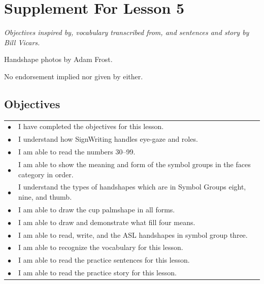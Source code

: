 \documentclass{article}
\begin{document}
\newfontfamily{}
\newfontfamily{}
\newcommand{\bul}{\hfil$\bullet$&}
\renewenvironment{glossary}{\begin{multicols}{5}\begin{center}}{\end{center}\end{multicols}}
\setcounter{secnumdepth}{0}
\setlength{\columnseprule}{1pt}

\section{Supplement For Lesson 5}

\begin{center}
\it
Objectives inspired by, vocabulary transcribed from, and sentences and story by Bill Vicars.

Handshape photos by Adam Frost.

No endorsement implied nor given by either.
\end{center}

\subsection{Objectives}

\begin{tabular}{p{1cm}p{14cm}}
\bul I have completed the objectives for this lesson.\\
\bul I understand how SignWriting handles eye-gaze and roles.\\
\bul I am able to read the numbers 30--99.\\
\bul I am able to show the meaning and form of the symbol groups in the faces category in order.\\
\bul I understand the types of handshapes which are in Symbol Groups eight, nine, and thumb.\\
\bul I am able to draw the cup palmshape in all forms.\\
\bul I am able to draw and demonstrate what fill four means.\\
\bul I am able to read, write, and the ASL handshapes in symbol group three.\\
\bul I am able to recognize the vocabulary for this lesson.\\
\bul I am able to read the practice sentences for this lesson.\\
\bul I am able to read the practice story for this lesson.\\
\end{tabular}
\end{document}
